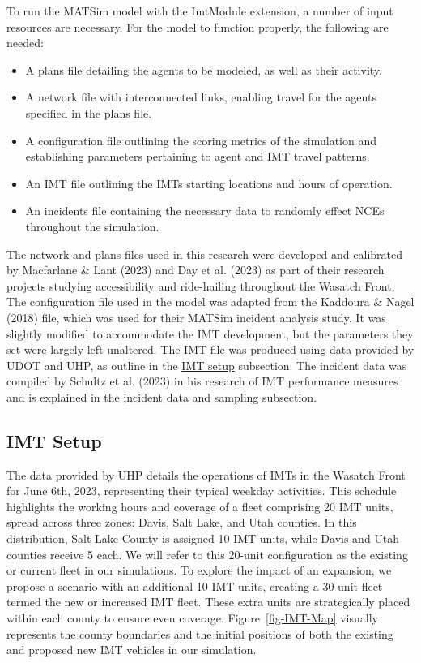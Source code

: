 \documentclass[fancy, oneside, mastersfancy, ms]{byuthesis}
\providecommand{\tightlist}{%
  \setlength{\itemsep}{0pt}\setlength{\parskip}{0pt}}\usepackage{longtable,booktabs,array}
\begin{document}
To run the MATSim model with the ImtModule extension, a number of input
resources are necessary. For the model to function properly, the
following are needed:

\begin{itemize}
\tightlist
\item
  A plans file detailing the agents to be modeled, as well as their
  activity.
\item
  A network file with interconnected links, enabling travel for the
  agents specified in the plans file.
\item
  A configuration file outlining the scoring metrics of the simulation
  and establishing parameters pertaining to agent and IMT travel
  patterns.
\item
  An IMT file outlining the IMTs starting locations and hours of
  operation.
\item
  An incidents file containing the necessary data to randomly effect
  NCEs throughout the simulation.
\end{itemize}

The network and plans files used in this research were developed and
calibrated by Macfarlane \& Lant (2023) and Day et al. (2023) as part of
their research projects studying accessibility and ride-hailing
throughout the Wasatch Front. The configuration file used in the model
was adapted from the Kaddoura \& Nagel (2018) file, which was used for
their MATSim incident analysis study. It was slightly modified to
accommodate the IMT development, but the parameters they set were
largely left unaltered. The IMT file was produced using data provided by
UDOT and UHP, as outline in the \protect\hyperlink{sec-MATSim_mod}{IMT
setup} subsection. The incident data was compiled by Schultz et al.
(2023) in his research of IMT performance measures and is explained in
the \protect\hyperlink{sec-inc_data}{incident data and sampling}
subsection.

\hypertarget{sec-IMT_setup}{%
\subsection{IMT Setup}\label{sec-IMT_setup}}

The data provided by UHP details the operations of IMTs in the Wasatch
Front for June 6th, 2023, representing their typical weekday activities.
This schedule highlights the working hours and coverage of a fleet
comprising 20 IMT units, spread across three zones: Davis, Salt Lake,
and Utah counties. In this distribution, Salt Lake County is assigned 10
IMT units, while Davis and Utah counties receive 5 each. We will refer
to this 20-unit configuration as the existing or current fleet in our
simulations. To explore the impact of an expansion, we propose a
scenario with an additional 10 IMT units, creating a 30-unit fleet
termed the new or increased IMT fleet. These extra units are
strategically placed within each county to ensure even coverage.
Figure~\ref{fig-IMT-Map} visually represents the county boundaries and
the initial positions of both the existing and proposed new IMT vehicles
in our simulation.
\end{document}
